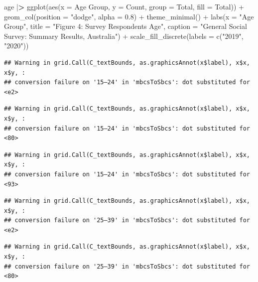 \documentclass[
]{article}
\newenvironment{Shaded}{\begin{snugshade}}{\end{snugshade}}
\newcommand{\AttributeTok}[1]{\textcolor[rgb]{0.77,0.63,0.00}{#1}}
\newcommand{\ErrorTok}[1]{\textcolor[rgb]{0.64,0.00,0.00}{\textbf{#1}}}
\newcommand{\FloatTok}[1]{\textcolor[rgb]{0.00,0.00,0.81}{#1}}
\newcommand{\FunctionTok}[1]{\textcolor[rgb]{0.00,0.00,0.00}{#1}}
\newcommand{\NormalTok}[1]{#1}
\newcommand{\SpecialCharTok}[1]{\textcolor[rgb]{0.00,0.00,0.00}{#1}}
\newcommand{\StringTok}[1]{\textcolor[rgb]{0.31,0.60,0.02}{#1}}
\begin{document}
\begin{Shaded}
\begin{Highlighting}[]
\NormalTok{age }\SpecialCharTok{|}\ErrorTok{\textgreater{}} 
  \FunctionTok{ggplot}\NormalTok{(}\FunctionTok{aes}\NormalTok{(}\AttributeTok{x =} \StringTok{\textasciigrave{}}\AttributeTok{Age Group}\StringTok{\textasciigrave{}}\NormalTok{, }\AttributeTok{y =}\NormalTok{ Count, }\AttributeTok{group =}\NormalTok{ Total, }\AttributeTok{fill =}\NormalTok{ Total)) }\SpecialCharTok{+}
  \FunctionTok{geom\_col}\NormalTok{(}\AttributeTok{position =} \StringTok{"dodge"}\NormalTok{, }\AttributeTok{alpha =} \FloatTok{0.8}\NormalTok{) }\SpecialCharTok{+}
  \FunctionTok{theme\_minimal}\NormalTok{() }\SpecialCharTok{+} 
  \FunctionTok{labs}\NormalTok{(}\AttributeTok{x =} \StringTok{"Age Group"}\NormalTok{, }\AttributeTok{title =} \StringTok{"Figure 4: Survey Respondent\textquotesingle{}s Age"}\NormalTok{, }\AttributeTok{caption =} \StringTok{"General Social Survey: Summary Results, Australia"}\NormalTok{) }\SpecialCharTok{+} \FunctionTok{scale\_fill\_discrete}\NormalTok{(}\AttributeTok{labels =} \FunctionTok{c}\NormalTok{(}\StringTok{"2019"}\NormalTok{, }\StringTok{"2020"}\NormalTok{))}
\end{Highlighting}
\end{Shaded}

\begin{verbatim}
## Warning in grid.Call(C_textBounds, as.graphicsAnnot(x$label), x$x, x$y, :
## conversion failure on '15–24' in 'mbcsToSbcs': dot substituted for <e2>
\end{verbatim}

\begin{verbatim}
## Warning in grid.Call(C_textBounds, as.graphicsAnnot(x$label), x$x, x$y, :
## conversion failure on '15–24' in 'mbcsToSbcs': dot substituted for <80>
\end{verbatim}

\begin{verbatim}
## Warning in grid.Call(C_textBounds, as.graphicsAnnot(x$label), x$x, x$y, :
## conversion failure on '15–24' in 'mbcsToSbcs': dot substituted for <93>
\end{verbatim}

\begin{verbatim}
## Warning in grid.Call(C_textBounds, as.graphicsAnnot(x$label), x$x, x$y, :
## conversion failure on '25–39' in 'mbcsToSbcs': dot substituted for <e2>
\end{verbatim}

\begin{verbatim}
## Warning in grid.Call(C_textBounds, as.graphicsAnnot(x$label), x$x, x$y, :
## conversion failure on '25–39' in 'mbcsToSbcs': dot substituted for <80>
\end{verbatim}
\end{document}
